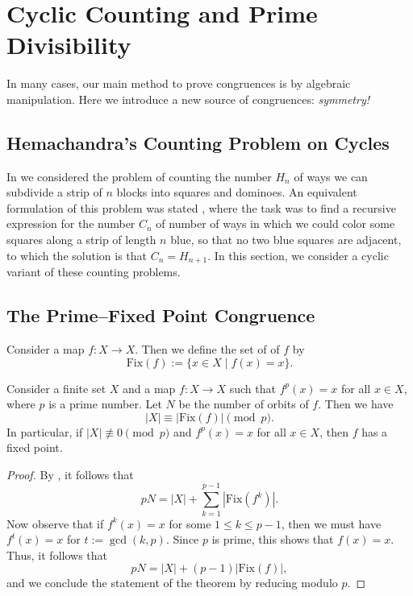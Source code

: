 \chapter{Cyclic Counting and Prime Divisibility}

In many cases, our main method to prove congruences is by algebraic manipulation. Here we introduce a new source of congruences: \emph{symmetry!}

\section{Hemachandra's Counting Problem on Cycles}

In  we considered the problem of counting the number $H_n$ of ways we can subdivide a strip of $n$ blocks into squares and dominoes. An equivalent formulation of this problem was stated , where the task was to find a recursive expression for the number $C_n$ of number of ways in which we could color some squares along a strip of length $n$ blue, so that no two blue squares are adjacent, to which the solution is that $C_n=H_{n+1}$. In this section, we consider a cyclic variant of these counting problems.

\section{The Prime--Fixed Point Congruence}

\begin{definition}
  Consider a map $f:X \to X$. Then we define the set of  of $f$ by
  \begin{equation*}
    \mathrm{Fix}(f):= \{x\in X\mid f(x)=x\}.
  \end{equation*}
\end{definition}

\begin{corollary}
  Consider a finite set $X$ and a map $f:X\to X$ such that $f^p(x)=x$ for all $x\in X$, where $p$ is a prime number. Let $N$ be the number of orbits of $f$. Then we have
  \begin{equation*}
    |X| \equiv |\mathrm{Fix}(f)| \pmod{p}.
  \end{equation*}
  In particular, if $|X| \nequiv 0\pmod{p}$ and $f^p(x)=x$ for all $x\in X$, then $f$ has a fixed point.
\end{corollary}

\begin{proof}
  By , it follows that
  \begin{equation*}
    pN= |X| + \sum_{k=1}^{p-1}|\mathrm{Fix}(f^k)|.
  \end{equation*}
  Now observe that if $f^k(x)=x$ for some $1\leq k\leq p-1$, then we must have $f^t(x)=x$ for $t:=\gcd(k,p)$. Since $p$ is prime, this shows that $f(x)=x$. Thus, it follows that
  \begin{equation*}
    pN=|X| + (p-1) |\mathrm{Fix}(f)|,
  \end{equation*}
  and we conclude the statement of the theorem by reducing modulo $p$.
\end{proof}

